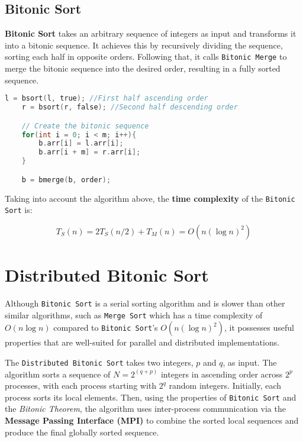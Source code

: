 \documentclass[12pt]{article}
\begin{document}
\subsection{Bitonic Sort}
\textbf{Bitonic Sort} takes an arbitrary sequence of integers as input and transforms it into a bitonic sequence. It achieves this by recursively dividing the sequence, sorting each half in opposite orders. Following that, it calls \texttt{Bitonic Merge} to merge the bitonic sequence into the desired order, resulting in a fully sorted sequence.
\vspace{0.3cm}
\begin{lstlisting}[language=C]
    l = bsort(l, true); //First half ascending order
    r = bsort(r, false); //Second half descending order

    // Create the bitonic sequence
    for(int i = 0; i < m; i++){
        b.arr[i] = l.arr[i];
        b.arr[i + m] = r.arr[i];
    }

    b = bmerge(b, order);
\end{lstlisting}
\vspace{0.3cm}
Taking into account the algorithm above, the \textbf{time complexity} of the \texttt{Bitonic Sort} is:

\[T_S(n) = 2 T_S(n/2) + T_M(n) = O(n (\log n)^2)\]

\newpage

\section{Distributed Bitonic Sort}

Although \texttt{Bitonic Sort} is a serial sorting algorithm and is slower than other similar algorithms, such as \texttt{Merge Sort} which has a time complexity of \(O(n \log n)\) compared to \texttt{Bitonic Sort}'s \(O(n (\log n)^2)\), it possesses useful properties that are well-suited for parallel and distributed implementations.

The \texttt{Distributed Bitonic Sort} takes two integers, \textbf{\( p \)} and \textbf{\( q \)}, as input. The algorithm sorts a sequence of \textbf{\( N = 2^{(q + p)} \)} integers in ascending order across \textbf{\( 2^p \)} processes, with each process starting with \textbf{\( 2^q \)} random integers. Initially, each process sorts its local elements. Then, using the properties of \texttt{Bitonic Sort} and the \textit{Bitonic Theorem}, the algorithm uses inter-process communication via the \textbf{Message Passing Interface (MPI)} to combine the sorted local sequences and produce the final globally sorted sequence.
\end{document}
